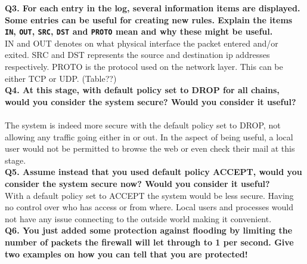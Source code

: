 \noindent \textbf{Q3. For each entry in the log, several information items are
displayed. Some entries can be useful for creating new rules. Explain the 
items \texttt{IN}, \texttt{OUT}, \texttt{SRC}, \texttt{DST} and \texttt{PROTO}
mean and why these might be useful.}
~\ \\

IN and OUT denotes on what physical interface the packet entered and/or exited. SRC and DST represents the source and destination ip addresses respectively. PROTO is the protocol used on the network layer. This can be either TCP or UDP. (Table??)
~\ \\

\noindent \textbf{Q4. At this stage, with default policy set to DROP for all 
chains, would you consider the system secure? Would you consider it useful?}
~\ \\

The system is indeed more secure with the default policy set to DROP, not allowing any traffic going either in or out. In the aspect of being useful, a local user would not be permitted to browse the web or even check their mail at this stage.
~\ \\

\noindent \textbf{Q5. Assume instead that you used default policy ACCEPT, 
would you consider the system secure now? Would you consider it useful?}
~\ \\

With a default policy set to ACCEPT the system would be less secure. Having no control over who has access or from where. Local users and processes would not have any issue connecting to the outside world making it convenient. 
~\ \\

\noindent \textbf{Q6. You just added some protection against flooding by 
limiting the number of packets the firewall will let through to 1 per second. 
Give two examples on how you can tell that you are protected!}
~\ \\
